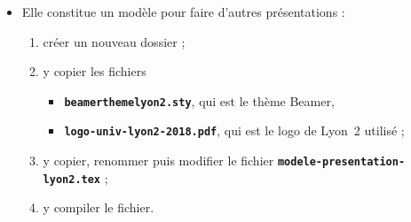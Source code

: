   \begin{itemize}
  \item Elle constitue un modèle pour faire d'autres présentations :
    
    \begin{enumerate}
    \item créer un nouveau dossier ;
    \item y copier les fichiers 

      \begin{itemize}
      \item \texttt{\textbf{beamerthemelyon2.sty}}, qui est le thème Beamer,
      \item \texttt{\textbf{logo-univ-lyon2-2018.pdf}}, qui est le logo de Lyon~2 utilisé ;
      \end{itemize}

    \item y copier, renommer puis modifier le fichier \texttt{\textbf{modele-presentation-lyon2.tex}} ;
    \item y compiler le fichier.
    \end{enumerate}
  \end{itemize}
